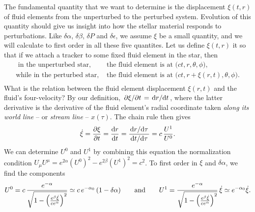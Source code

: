 The fundamental quantity that we want to determine is the displacement $\xi(t, r)$ of fluid elements from the unperturbed to the perturbed system.
Evolution of this quantity should give us insight into how the stellar material responds to perturbations.
Like $\delta \alpha$, $\delta \beta$, $\delta P$ and $\delta \epsilon$, we assume $\xi$ be a small quantity, and we will calculate to first order in all these five quantites.
Let us define $\xi(t, r)$ it so that if we attach a tracker to some fixed fluid element in the star, then
\begin{equation}
\begin{split}
	\text{      in the unperturbed star, } & \text{the fluid element is at $\big(ct,r,\theta,\phi\big)$,} \\
	\text{while in the   perturbed star, } & \text{the fluid element is at $\big(ct,r+\xi(r,t),\theta,\phi\big)$.} \\
\end{split}
\end{equation}
What is the relation between the fluid element displacement $\xi(r,t)$ and the fluid's four-velocity?
By our definition, $\pdv{\xi}/{t} = \odv{r}/{t}$, where the latter derivative is the derivative of the fluid element's radial coordinate taken \emph{along its world line} -- or \emph{stream line} -- $x(\tau)$.
The chain rule then gives
\begin{equation}
	\dot\xi = \pdv{\xi}{t} = \odv{r}{t} = \frac{\odv{r}/{\tau}}{\odv{t}/{\tau}} = c \, \frac{U^1}{U^0} .
\end{equation}
We can determine $U^0$ and $U^1$ by combining this equation the normalization condition $U_\mu U^\mu = e^{2 \alpha} \left( U^0 \right)^2 - e^{2 \beta} \left( U^1 \right)^2 = c^2$.
To first order in $\xi$ and $\delta \alpha$, we find the components
\begin{equation}
	U^0%
	    =       c \, \frac{e^{-\alpha}}{\sqrt{1 - \left( \frac{e^\beta \dot\xi}{c e^\alpha} \right)^2 }}
	    \taylor c \, e^{-\alpha_0} \, (1 - \delta \alpha)
	\qquad \text{and} \qquad
	U^1 =        \frac{e^{-\alpha}}{\sqrt{1 - \left( \frac{e^\beta \dot\xi}{c e^\alpha} \right)^2 }} \, \dot\xi
	    \taylor  e^{-\alpha_0} \dot\xi .
\end{equation}

